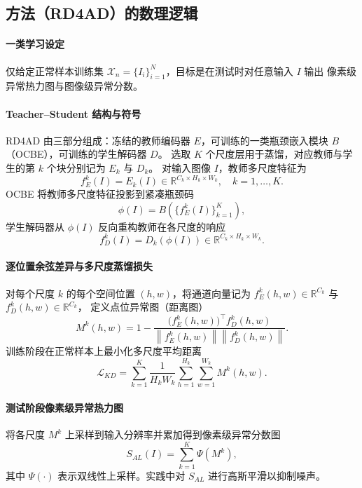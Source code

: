 \documentclass[a4paper,11pt,UTF8]{ctexart}
\begin{document}
\subsection{方法（RD4AD）的数理逻辑}

\paragraph{一类学习设定}
仅给定正常样本训练集 $\mathcal{X}_n=\{I_i\}_{i=1}^{N}$，目标是在测试时对任意输入 $I$ 输出
像素级异常热力图与图像级异常分数。

\paragraph{Teacher--Student 结构与符号}
RD4AD 由三部分组成：冻结的教师编码器 $E$，可训练的一类瓶颈嵌入模块 $B$（OCBE），可训练的学生解码器 $D$。
选取 $K$ 个尺度层用于蒸馏，对应教师与学生的第 $k$ 个块分别记为 $E_k$ 与 $D_k$。
对输入图像 $I$，教师多尺度特征为
\begin{equation}
f_E^k(I)=E_k(I)\in \mathbb{R}^{C_k\times H_k\times W_k},\quad k=1,\dots,K.
\end{equation}
OCBE 将教师多尺度特征投影到紧凑瓶颈码
\begin{equation}
\phi(I)=B\!\left(\{f_E^k(I)\}_{k=1}^K\right),
\end{equation}
学生解码器从 $\phi(I)$ 反向重构教师在各尺度的响应
\begin{equation}
f_D^k(I)=D_k(\phi(I))\in \mathbb{R}^{C_k\times H_k\times W_k}.
\end{equation}

\paragraph{逐位置余弦差异与多尺度蒸馏损失}
对每个尺度 $k$ 的每个空间位置 $(h,w)$，将通道向量记为
$f_E^k(h,w)\in\mathbb{R}^{C_k}$ 与 $f_D^k(h,w)\in\mathbb{R}^{C_k}$，
定义点位异常图（距离图）
\begin{equation}
M^k(h,w)
=
1-\frac{\big(f_E^k(h,w)\big)^{\top} f_D^k(h,w)}
{\left\|f_E^k(h,w)\right\|\left\|f_D^k(h,w)\right\|}.
\label{eq:rd4ad_mk}
\end{equation}
训练阶段在正常样本上最小化多尺度平均距离
\begin{equation}
\mathcal{L}_{KD}
=
\sum_{k=1}^{K}\frac{1}{H_kW_k}
\sum_{h=1}^{H_k}\sum_{w=1}^{W_k} M^k(h,w).
\label{eq:rd4ad_loss}
\end{equation}

\paragraph{测试阶段像素级异常热力图}
将各尺度 $M^k$ 上采样到输入分辨率并累加得到像素级异常分数图
\begin{equation}
S_{AL}(I)
=
\sum_{k=1}^{K}\Psi\!\left(M^k\right),
\label{eq:rd4ad_sal}
\end{equation}
其中 $\Psi(\cdot)$ 表示双线性上采样。实践中对 $S_{AL}$ 进行高斯平滑以抑制噪声。
\end{document}

